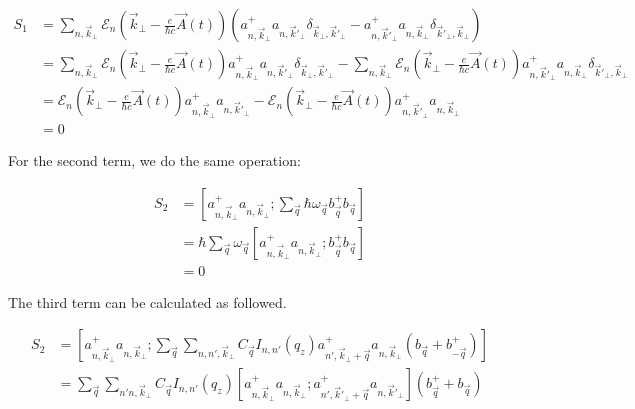 \documentclass{article}
\begin{document}
\begin{align}
    S_{1}
    &= \sum_{n,\vec{k}_{\perp}} \mathcal{E}_{n}\left(\vec{k}_{\perp} - \frac{e}{\hbar c} \vec{A}(t)\right) \left(a^{+}_{n,\vec{k}_{\perp}} a_{n,\vec{k}'_{\perp}} \delta_{\vec{k}_{\perp},\vec{k}'_{\perp}} - a^{+}_{n,\vec{k}'_{\perp}} a_{n,\vec{k}_{\perp}} \delta_{\vec{k}'_{\perp},\vec{k}_{\perp}}\right)\\
    & = \sum_{n,\vec{k}_{\perp}} \mathcal{E}_{n}\left(\vec{k}_{\perp} - \frac{e}{\hbar c} \vec{A}(t)\right) a^{+}_{n,\vec{k}_{\perp}} a_{n,\vec{k}'_{\perp}} \delta_{\vec{k}_{\perp},\vec{k}'_{\perp}} - \sum_{n,\vec{k}_{\perp}} \mathcal{E}_{n}\left(\vec{k}_{\perp} - \frac{e}{\hbar c} \vec{A}(t)\right) a^{+}_{n,\vec{k}'_{\perp}} a_{n,\vec{k}_{\perp}} \delta_{\vec{k}'_{\perp},\vec{k}_{\perp}}\\
    & = \mathcal{E}_{n}\left(\vec{k}_{\perp} - \frac{e}{\hbar c} \vec{A}(t)\right)a^{+}_{n,\vec{k}_{\perp}} a_{n,\vec{k}'_{\perp}} - \mathcal{E}_{n}\left(\vec{k}_{\perp} - \frac{e}{\hbar c} \vec{A}(t)\right) a^{+}_{n,\vec{k}'_{\perp}} a_{n,\vec{k}_{\perp}}\\
    & = 0
\end{align}

For the second term, we do the same operation:

\begin{align}
    S_{2} & = \left[ a^{+}_{n,\vec{k}_{\perp}}a_{n,\vec{k}_{\perp}} ; \sum_{\vec{q}} \hbar \omega_{\vec{q}} b^{+}_{\vec{q}}b_{\vec{q}} \right] \\
    & = \hbar \sum_{\vec{q}} \omega_{\vec{q}} \left[ a^{+}_{n,\vec{k}_{\perp}} a_{n,\vec{k}_{\perp}}; b^{+}_{\vec{q}}b_{\vec{q}} \right] \\
    & = 0
\end{align}

The third term can be calculated as followed. 

\begin{align}
    S_{2} 
    & = \left[ a^{+}_{n,\vec{k}_{\perp}} a_{n,\vec{k}_{\perp}} ; \sum_{\vec{q}} \sum_{n,n', \vec{k}_{\perp}} C_{\vec{q}} I_{n,n'}(q_{z}) a^{+}_{n',\vec{k}_{\perp}+\vec{q}} a_{n,\vec{k}_{\perp}} \left(b_{\vec{q}} + b^{+}_{- \vec{q}}\right)\right]\\
    & = \sum_{\vec{q}} \sum_{n'n, \vec{k}_{\perp}} C_{\vec{q}} I_{n,n'}(q_{z}) \left[a^{+}_{n,\vec{k}_{\perp}} a_{n,\vec{k}_{\perp}} ; a^{+}_{n',\vec{k}'_{\perp}+\vec{q}} a_{n,\vec{k}'_{\perp}} \right] \left(b^{+}_{\vec{q}}+b_{\vec{q}}\right)
\end{align}
\end{document}
